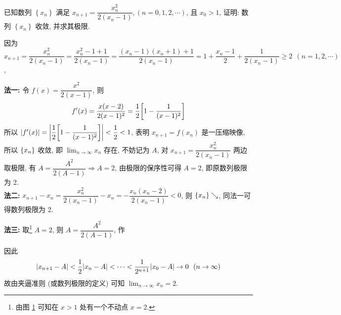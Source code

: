 \begin{example}
    已知数列 $ \left\{x_{n}\right\} $ 满足 $ x_{n+1}=\dfrac{x_{n}^{2}}{2\left(x_{n}-1\right)},(n=0,1,2, \cdots)  $, 且 $ x_{0}>1$, 证明: 数列 $ \left\{x_{n}\right\} $ 收敛, 并求其极限.
\end{example}
\begin{solution}
    因为 $x_{n+1}=\dfrac{x_n^2}{2(x_n-1)}=\dfrac{x_n^2-1+1}{2(x_n-1)}=\dfrac{(x_n-1)(x_n+1)+1}{2(x_n-1)}=1+\dfrac{x_n-1}{2}+\dfrac{1}{2(x_n-1)}\geqslant 2~~(n=1,2,\cdots)$, \\
    \begin{minipage}{0.29\linewidth}
        \begin{figure}[H]
            \centering
            \caption{}
            \label{bddxn2xn1}
        \end{figure}
    \end{minipage}\hfill
    \begin{minipage}{0.7\linewidth}
        \textbf{法一: }令 $f(x)=\dfrac{x^2}{2(x-1)}$, 则
        $$f'(x)=\dfrac{x(x-2)}{2(x-1)^2}=\dfrac{1}{2}\qty[1-\dfrac{1}{(x-1)^2}]$$
        所以 $|f'(x)|=\qty|\dfrac{1}{2}\qty[1-\dfrac{1}{(x-1)^2}]|<\dfrac{1}{2}<1$, 表明 $x_{n+1}=f(x_n)$ 是一压缩映像, 所以 $\qty{x_n}$ 收敛, 即 $\displaystyle\lim_{n\to\infty}x_n$ 存在, 不妨记为 $A$, 对 $x_{n+1}=\dfrac{x_n^2}{2(x_n-1)} $ 两边取极限, 有
        $A=\dfrac{A^2}{2(A-1)}\Rightarrow A=2$, 由极限的保序性可得 $A=2$, 即原数列极限为 2.\\
        \textbf{法二: }$x_{n+1}-x_n=\dfrac{x_n^2}{2(x_n-1)}-x_n=-\dfrac{x_n(x_n-2)}{2(x_n-1)}<0$, 则 $\qty{x_n}\searrow$, 同法一可得数列极限为 2.
    \end{minipage}
    \textbf{法三: }取\footnote{由图 \ref{bddxn2xn1} 可知在 $x>1$ 处有一个不动点 $x=2$.} $A=2$, 则 $A=\dfrac{A^2}{2(A-1)}$, 作 
    因此 $$\qty|x_{n+1}-A|<\dfrac{1}{2}\qty|x_n-A|<\cdots<\dfrac{1}{2^{n+1}}\qty|x_0-A|\to 0~~(n\to\infty)$$
    故由夹逼准则 (或数列极限的定义) 可知 $\displaystyle\lim_{n\to\infty}x_n=2.$
\end{solution}

